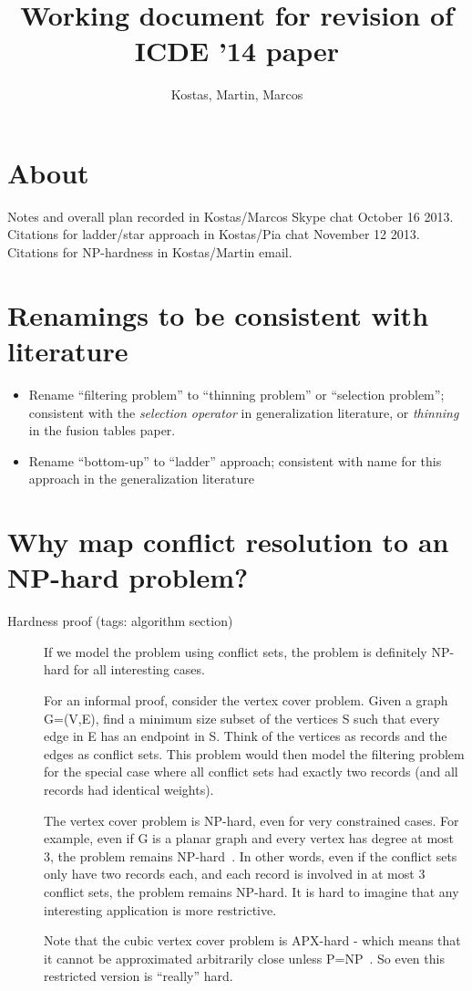 \documentclass[11pt, oneside]{article}   	%
\title{Working document for revision of ICDE '14 paper}
\author{Kostas, Martin, Marcos}
\begin{document}
\maketitle

\section{About}
Notes and overall plan recorded in Kostas/Marcos Skype chat October 16 2013. Citations for ladder/star approach in Kostas/Pia chat November 12 2013. Citations for NP-hardness in Kostas/Martin email.

\section{Renamings to be consistent with literature}

\begin{itemize}
\item Rename ``filtering problem'' to ``thinning problem'' or ``selection problem''; consistent with the \emph{selection operator} in generalization literature, or \emph{thinning} in the fusion tables paper.
\item Rename ``bottom-up'' to ``ladder'' approach; consistent with name for this approach in the generalization literature~\cite{foerster2010challenges}
\end{itemize}

\section{Why map conflict resolution to an NP-hard problem?}

\begin{description}
\item[Hardness proof (tags: algorithm section)] If we model the problem using conflict sets, the problem is
definitely NP-hard for all interesting cases.

For an informal proof, consider the vertex cover problem. Given a graph G=(V,E),
find a minimum size subset of the vertices S such that every edge in E
has an endpoint in S. Think of the vertices as records and the edges
as conflict sets. This problem would then model the filtering problem
for the special case where all conflict sets had exactly two records
(and all records had identical weights).

The vertex cover problem is NP-hard, even for very constrained cases.
For example, even if G is a planar graph and every vertex has degree
at most 3, the problem remains NP-hard~\cite{garey1977rectilinear}. In other words, even if the
conflict sets only have two records each, and each record is involved
in at most 3 conflict sets, the problem remains NP-hard. It is hard to
imagine that any interesting application is more restrictive.

Note that the cubic vertex cover problem is APX-hard - which
means that it cannot be approximated arbitrarily close unless P=NP~\cite{alimonti2000some}. So even this restricted version is ``really'' hard.
\end{description}
\end{document}
